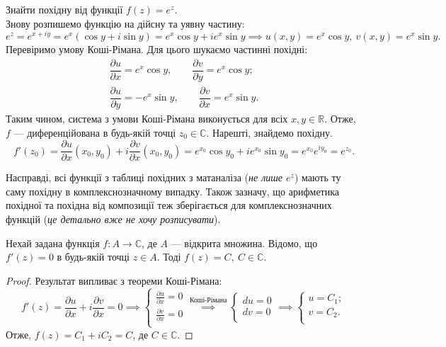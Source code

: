 \documentclass{math_library}
\begin{document}
\begin{example}
Знайти похідну від функції $f(z)=e^z$.\\
Знову розпишемо функцію на дійсну та уявну частину:
\[
e^z=e^{x+iy}=e^x(\cos y+i \sin y)=e^x \cos y +i e^x \sin y \implies u(x,y)=e^x \cos y,\ v(x,y) = e^x \sin y.
\]
Перевіримо умову Коші-Рімана. Для цього шукаємо частинні похідні:
\begin{align*}
\dfrac{\partial u}{\partial x}=e^x \cos y, \qquad \dfrac{\partial v}{\partial y}=e^x \cos y; \\
\dfrac{\partial u}{\partial y}=-e^x \sin y, \qquad \dfrac{\partial v}{\partial x}=e^x \sin y.
\end{align*}
Таким чином, система з умови Коші-Рімана виконується для всіх $x,y \in \mathbb{R}$. Отже, $f$ --- диференційована в будь-якій точці $z_0 \in \mathbb{C}$. Нарешті, знайдемо похідну.
\[
f'(z_0)=\frac{\partial u}{\partial x}(x_0,y_0) + i\frac{\partial v}{\partial x}(x_0,y_0) = e^{x_0} \cos y_0 + ie^{x_0} \sin y_0 = e^{x_0} e^{iy_0} = e^{z_0}.
\]
\end{example}

\begin{remark}
Насправді, всі функції з таблиці похідних з матаналіза (\textit{не лише $e^z$}) мають ту саму похідну в комплекснозначному випадку. Також зазначу, що арифметика похідної та похідна від композиції теж зберігається для комплекснозначних функцій (\textit{це детально вже не хочу розписувати}).
\end{remark}

\begin{theorem}
Нехай задана функція $f \colon A \to \mathbb{C}$, де $A$ --- відкрита множина. Відомо, що $f'(z) = 0$ в будь-якій точці $z \in A$. Тоді $f(z)=C,\ C \in \mathbb{C}$.
\end{theorem}

\begin{proof}
Результат випливає з теореми Коші-Рімана:
\[
f'(z)=\frac{\partial u}{\partial x} + i\frac{\partial v}{\partial x} = 0 \implies \begin{cases}
	\displaystyle\frac{\partial u}{\partial x}=0\\
	\displaystyle\frac{\partial v}{\partial x}=0\\
	\end{cases} \overset{\textrm{Коші-Рімана}}{\implies}
	\begin{cases}
	du=0\\
	dv=0\\
	\end{cases} \implies
	\begin{cases}
	u=C_1;\\
	v=C_2.\\
	\end{cases}
\]
Отже, $f(z)=C_1 + i C_2 = C$, де $C \in \mathbb{C}$.
\end{proof}
\end{document}
